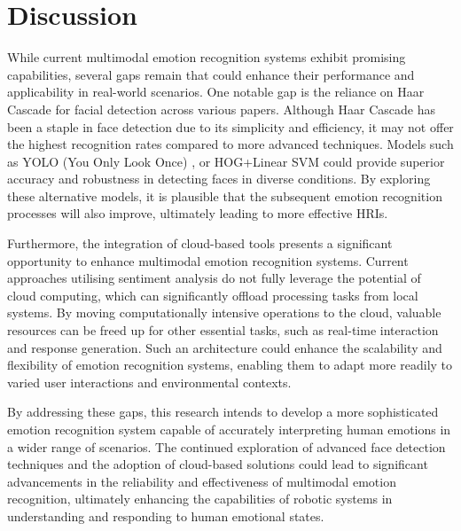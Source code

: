 \section{Discussion}
While current multimodal emotion recognition systems exhibit promising capabilities, several gaps remain that could enhance their performance and applicability in real-world scenarios. One notable gap is the reliance on Haar Cascade for facial detection across various papers. Although Haar Cascade has been a staple in face detection due to its simplicity and efficiency, it may not offer the highest recognition rates compared to more advanced techniques. Models such as YOLO (You Only Look Once) \cite{Redmon2015-eb}, or HOG+Linear SVM \cite{Singh2020-ui} could provide superior accuracy and robustness in detecting faces in diverse conditions. By exploring these alternative models, it is plausible that the subsequent emotion recognition processes will also improve, ultimately leading to more effective HRIs.

Furthermore, the integration of cloud-based tools presents a significant opportunity to enhance multimodal emotion recognition systems. Current approaches utilising sentiment analysis do not fully leverage the potential of cloud computing, which can significantly offload processing tasks from local systems. By moving computationally intensive operations to the cloud, valuable resources can be freed up for other essential tasks, such as real-time interaction and response generation. Such an architecture could enhance the scalability and flexibility of emotion recognition systems, enabling them to adapt more readily to varied user interactions and environmental contexts.

By addressing these gaps, this research intends to develop a more sophisticated emotion recognition system capable of accurately interpreting human emotions in a wider range of scenarios. The continued exploration of advanced face detection techniques and the adoption of cloud-based solutions could lead to significant advancements in the reliability and effectiveness of multimodal emotion recognition, ultimately enhancing the capabilities of robotic systems in understanding and responding to human emotional states.


